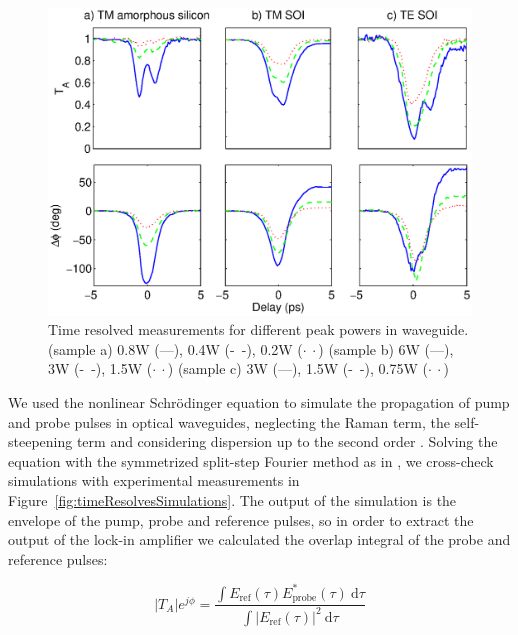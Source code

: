 \documentclass[10pt,letterpaper]{article}
\begin{document}
\begin{figure}[htb]
    \centering
    \includegraphics[width=1.00\textwidth]{timeResAmorfoTm10mmP13b_1w_0p5_0p25_0p125_amp_SOI_2}
    \caption{Time resolved measurements for different peak powers in waveguide. (sample a) 0.8W (---), 0.4W (-~-), 0.2W ($\cdot~\cdot$) (sample b) 6W (---), 3W (-~-), 1.5W ($\cdot~\cdot$) (sample c) 3W (---), 1.5W (-~-), 0.75W ($\cdot~\cdot$) }
    \label{fig:timeResolvesMeasurements}
\end{figure}



We used the nonlinear Schr\"{o}dinger equation to simulate the propagation of pump and probe pulses in optical waveguides, neglecting the Raman term, the self-steepening term and considering dispersion up to the second order \cite{Agrawal2001a}. Solving the equation with the symmetrized split-step Fourier method as in \cite{Lin2007,Matres:12}, we cross-check simulations with experimental measurements in Figure~\ref{fig:timeResolvesSimulations}. The output of the simulation is the envelope of the pump, probe and reference pulses, so in order to extract the output of the lock-in amplifier we calculated the overlap integral of the probe and reference pulses:


\begin{equation}
        |T_{A}|e^{j\phi} =
        \frac{\int E_{\mathrm{ref}}(\tau) E^*_{\mathrm{probe}}(\tau) ~ \mathrm{d}\tau}
        {\int |E_{\mathrm{ref}}(\tau)|^2~\mathrm{d}\tau}
\end{equation}
\end{document}
